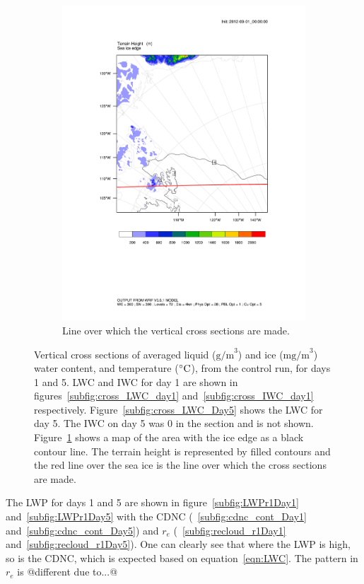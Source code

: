 \begin{figure}[ht]
\begin{subfigure}{0.48\textwidth}
        \includegraphics[width=\textwidth]{results/control/crossSec_line.pdf}
        \caption{Line over which the vertical cross sections are made.}
        \label{subfig:cross_line}
    \end{subfigure}
    \caption{Vertical cross sections of averaged liquid ($\text{g/m}^3$) and ice  ($\text{mg/m}^3$) water content, and temperature ($\degree\text{C}$), from the control run, for days 1 and 5. LWC and IWC for day 1 are shown in figures~\ref{subfig:cross_LWC_day1} and~\ref{subfig:cross_IWC_day1} respectively. Figure~\ref{subfig:cross_LWC_Day5} shows the LWC for day 5. The IWC on day 5 was 0 in the section and is not shown. Figure~\ref{subfig:cross_line} shows a map of the area with the ice edge as a black contour line. The terrain height is represented by filled contours and the red line over the sea ice is the line over which the cross sections are made.}
    \label{fig:weather}
\end{figure}

The LWP for days 1 and 5 are shown in figure~\ref{subfig:LWPr1Day1} and~\ref{subfig:LWPr1Day5} with the CDNC (~\ref{subfig:cdnc_cont_Day1} and~\ref{subfig:cdnc_cont_Day5}) and $r_e$ (~\ref{subfig:recloud_r1Day1} and~\ref{subfig:recloud_r1Day5}). One can clearly see that where the LWP is high, so is the CDNC, which is expected based on equation~\ref{eqn:LWC}. The pattern in $r_e$ is @different due to...@

